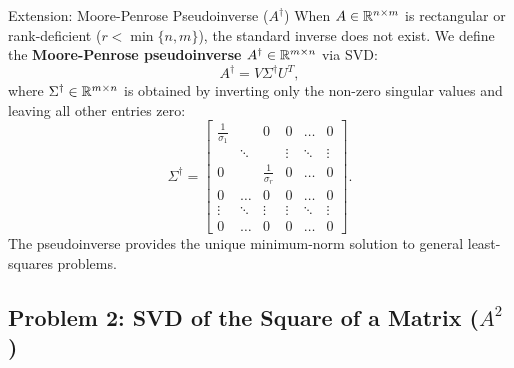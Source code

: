 \begin{noteblock}{Extension: Moore-Penrose Pseudoinverse ($A^\dagger$)}
When $A \in \mathbb{R}^{n \times m}$ is rectangular or rank-deficient ($r < \min\{n, m\}$), the standard inverse does not exist. We define the \textbf{Moore-Penrose pseudoinverse} $A^\dagger \in \mathbb{R}^{m \times n}$ via SVD:
\begin{equation}
    A^\dagger = V \Sigma^\dagger U^T,
\end{equation}
where $\Sigma^\dagger \in \mathbb{R}^{m \times n}$ is obtained by inverting only the non-zero singular values and leaving all other entries zero:
\begin{equation}
    \Sigma^\dagger = \begin{bmatrix}
        \frac{1}{\sigma_1} & & 0 & 0 & \dots & 0 \\
        & \ddots & & \vdots & \ddots & \vdots \\
        0 & & \frac{1}{\sigma_r} & 0 & \dots & 0 \\
        0 & \dots & 0 & 0 & \dots & 0 \\
        \vdots & \ddots & \vdots & \vdots & \ddots & \vdots \\
        0 & \dots & 0 & 0 & \dots & 0
    \end{bmatrix}.
\end{equation}
The pseudoinverse provides the unique minimum-norm solution to general least-squares problems.
\end{noteblock}

\subsection{Problem 2: SVD of the Square of a Matrix (\texorpdfstring{$A^2$}{A\textasciicircum 2})}


